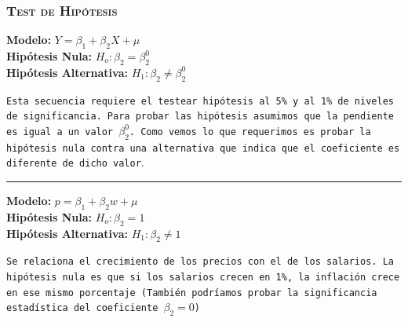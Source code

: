 \documentclass[16.5pt]{beamer}
\begin{document}
{
\begin{frame}
\frametitle{\textsc{Test de Hipótesis}}
\hspace*{-5mm}
\vspace*{-5mm} 

\textbf{Modelo:}   $Y=\beta_1 + \beta_2 X + \mu$ \\

\textbf{Hipótesis Nula:}   $H_o: \beta_2 = \beta_2^0$ \\

\textbf{Hipótesis Alternativa:}   $H_1: \beta_2 \neq \beta_2^0$

\texttt{Esta secuencia requiere el testear hipótesis al 5\% y al 1\% de niveles de significancia. Para probar las hipótesis asumimos que la pendiente es igual a un valor $\beta_2^0$. Como vemos lo que requerimos es probar la hipótesis nula contra una alternativa que indica que el coeficiente es diferente de dicho valor}. \\
\vspace{0.1cm}

\hrule  

\vspace{0.1cm}

\textbf{Modelo:}   $p=\beta_1 + \beta_2 w + \mu$ \\

\textbf{Hipótesis Nula:}   $H_o: \beta_2 = 1$ \\

\textbf{Hipótesis Alternativa:}   $H_1: \beta_2 \neq 1$

\texttt{Se relaciona el crecimiento de los precios con el de los salarios. La hipótesis nula es que si los salarios crecen en 1\%, la inflación crece en ese mismo porcentaje (También podríamos probar la significancia estadística del coeficiente $\beta_2=0$)}

\end{frame}
}
\end{document}
